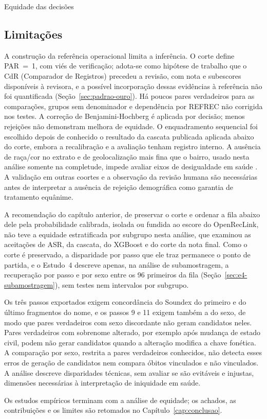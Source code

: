 \begin{chapter}{Equidade das decisões}
\subsection{Limitações}\label{sec:e5-limitacoes}

A construção da referência operacional limita a inferência. O corte define PAR~=~1, com viés de verificação; adota-se como hipótese de trabalho que o CdR (Comparador de Registros) precedeu a revisão, com nota e subescores disponíveis à revisora, e a possível incorporação dessas evidências à referência não foi quantificada (Seção~\ref{sec:padrao-ouro}). Há poucos pares verdadeiros para as comparações, grupos sem denominador e dependência por REFREC não corrigida nos testes. A correção de Benjamini-Hochberg é aplicada por decisão; menos rejeições não demonstram melhora de equidade. O enquadramento sequencial foi escolhido depois de conhecido o resultado da cascata publicada aplicada abaixo do corte, embora a recalibração e a avaliação tenham registro interno. A ausência de raça/cor no extrato e de geolocalização mais fina que o bairro, usado nesta análise somente na completude, impede avaliar eixos de desigualdade em saúde \cite{Mehrabi2021fairness}. A validação em outras coortes e a observação da revisão humana são necessárias antes de interpretar a ausência de rejeição demográfica como garantia de tratamento equânime.

A recomendação do capítulo anterior, de preservar o corte e ordenar a fila abaixo dele pela probabilidade calibrada, isolada ou fundida ao escore do OpenRecLink, não teve a equidade estratificada por subgrupo nesta análise, que examinou as aceitações de ASR, da cascata, do XGBoost e do corte da nota final. Como o corte é preservado, a disparidade por passo que ele traz permanece o ponto de partida, e o Estudo~4 descreve apenas, na análise de subamostragem, a recuperação por passo e por sexo entre os 96 primeiros da fila (Seção~\ref{sec:e4-subamostragem}), sem testes nem intervalos por subgrupo.

Os três passos exportados exigem concordância do Soundex do primeiro e do último fragmentos do nome, e os passos 9 e 11 exigem também a do sexo, de modo que pares verdadeiros com sexo discordante não geram candidatos neles. Pares verdadeiros com sobrenome alterado, por exemplo após mudança de estado civil, podem não gerar candidatos quando a alteração modifica a chave fonética. A comparação por sexo, restrita a pares verdadeiros conhecidos, não detecta esses erros de geração de candidatos nem compara óbitos vinculados e não vinculados. A análise descreve disparidades técnicas, sem avaliar se são evitáveis e injustas, dimensões necessárias à interpretação de iniquidade em saúde.

Os estudos empíricos terminam com a análise de equidade; os achados, as contribuições e os limites são retomados no Capítulo~\ref{cap:conclusao}.

\end{chapter}
